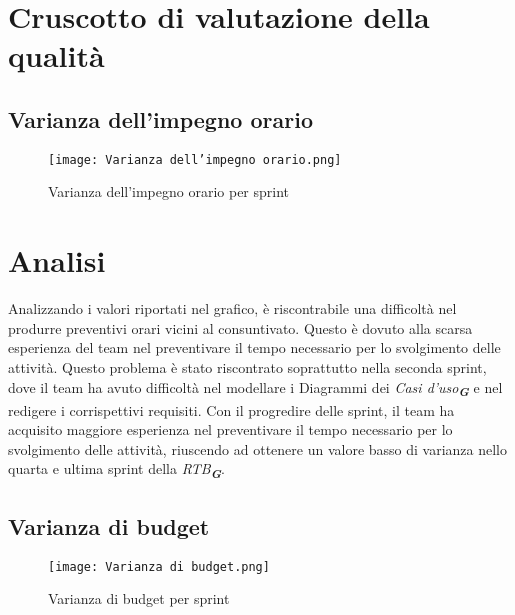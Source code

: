 

\section{Cruscotto di valutazione della qualità}
\label{sec:Cruscotto di valutazione della qualità}

\vspace{0.5cm}

\subsection{Varianza dell'impegno orario}
\label{subsec:Varianza dell'impegno orario}

\begin{figure}[h] 
    \centering
    \texttt{[image: Varianza dell'impegno orario.png]}
    \caption{Varianza dell'impegno orario per sprint}
    \label{fig: Varianza dell'impegno orario}
\end{figure}

\section*{Analisi}

Analizzando i valori riportati nel grafico, è riscontrabile una difficoltà nel produrre
preventivi orari vicini al consuntivato. Questo è dovuto alla scarsa esperienza del team
nel preventivare il tempo necessario per lo svolgimento delle attività. Questo problema
è stato riscontrato soprattutto nella seconda sprint, dove il team ha avuto difficoltà
nel modellare i Diagrammi dei \emph{Casi d'uso}\textsubscript{\textbf{\textit{G}}} e nel redigere i corrispettivi requisiti.
Con il progredire delle sprint, il team ha acquisito maggiore esperienza nel preventivare
il tempo necessario per lo svolgimento delle attività, riuscendo ad ottenere un valore
basso di varianza nello quarta e ultima sprint della \emph{RTB}\textsubscript{\textbf{\textit{G}}}.

\newpage

\subsection{Varianza di budget}
\label{subsec:Varianza di budget}

\begin{figure}[h] 
    \centering
    \texttt{[image: Varianza di budget.png]}
    \caption{Varianza di budget per sprint} 
    \label{fig: Varianza di budget}
\end{figure}

